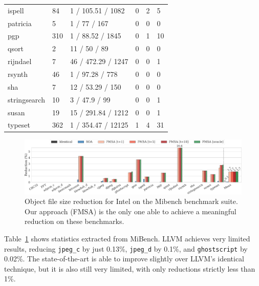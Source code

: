 \begin{table}[h]
{\begin{tabular}{llllll}
\rowcolor{evencolor} ispell        & 84    & 1 / 105.51 / 1082    & 0     & 2   & 5    \\
                     patricia      & 5     & 1 / 77 / 167         & 0     & 0   & 0    \\
\rowcolor{evencolor} pgp           & 310   & 1 / 88.52 / 1845     & 0     & 1   & 10   \\
                     qsort         & 2     & 11 / 50 / 89         & 0     & 0   & 0    \\
\rowcolor{evencolor} rijndael      & 7     & 46 / 472.29 / 1247   & 0     & 0   & 1    \\
                     rsynth        & 46    & 1 / 97.28 / 778      & 0     & 0   & 0    \\
\rowcolor{evencolor} sha           & 7     & 12 / 53.29 / 150     & 0     & 0   & 0    \\
                     stringsearch  & 10    & 3 / 47.9 / 99        & 0     & 0   & 1    \\
\rowcolor{evencolor} susan         & 19    & 15 / 291.84 / 1212   & 0     & 0   & 1    \\
                     typeset       & 362   & 1 / 354.47 / 12125   & 1     & 4   & 31   \\
\bottomrule
\end{tabular}
}
\label{tab:stats-mibench}
\end{table}


\begin{figure}[t]
  \centering
  \includegraphics[width=\linewidth]{figs/code-size-reduction-mibench.pdf}
  \caption{Object file size reduction for Intel on the Mibench benchmark suite.
   Our approach (FMSA) is the only one able to achieve a meaningful reduction on these benchmarks.}
  \label{fig:code-size-reduction-mibench}
\end{figure}

Table~\ref{tab:stats-mibench} shows statistics extracted from MiBench.
LLVM achieves very limited results, reducing \texttt{jpeg\_c} by just 0.13\%,
\texttt{jpeg\_d} by 0.1\%, and \texttt{ghostscript} by 0.02\%.
The state-of-the-art is able to improve slightly over LLVM's identical technique,
but it is also still very limited, with only reductions strictly less than 1\%.


